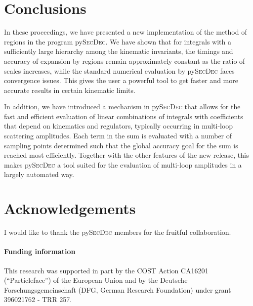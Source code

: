 \documentclass[Physsubmission, Phys]{SciPost}
\newcommand{\pysecdec}{py{\textsc{SecDec}}}
\begin{document}
\section{Conclusions}
In these proceedings, we have presented a new implementation of the method of regions in the program \pysecdec{}. We have shown that for integrals with a sufficiently large hierarchy among the kinematic invariants, the timings and accuracy of expansion by regions remain approximately constant as the ratio of scales increases, while the standard numerical evaluation by \pysecdec{} faces convergence issues.
This gives the user a powerful tool to get faster and more accurate results in certain kinematic limits.

In addition, we have introduced a mechanism in \pysecdec{}  that allows for the fast and efficient evaluation of linear combinations of integrals
with coefficients that depend on kinematics and regulators, typically occurring in multi-loop scattering amplitudes.
Each term in the sum is evaluated with a number of sampling points determined such that the global accuracy goal for the sum is reached most efficiently.
Together with the other features of the new release, this makes \pysecdec{} a tool suited for the evaluation of multi-loop amplitudes in a largely automated way.

\newpage

\section*{Acknowledgements}

I would like to thank the \pysecdec{} members for the fruitful collaboration.

\paragraph{Funding information}
This research was supported in part by the COST Action CA16201 (``Particleface'') of the European Union
and by  the  Deutsche  Forschungsgemeinschaft (DFG, German Research Foundation) under grant 396021762 - TRR 257.




\nolinenumbers
\end{document}
